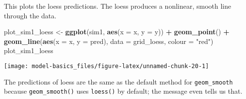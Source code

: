 \documentclass[]{book}
\newenvironment{Shaded}{\begin{snugshade}}{\end{snugshade}}
\newcommand{\DataTypeTok}[1]{\textcolor[rgb]{0.13,0.29,0.53}{#1}}
\newcommand{\KeywordTok}[1]{\textcolor[rgb]{0.13,0.29,0.53}{\textbf{#1}}}
\newcommand{\NormalTok}[1]{#1}
\newcommand{\OperatorTok}[1]{\textcolor[rgb]{0.81,0.36,0.00}{\textbf{#1}}}
\newcommand{\StringTok}[1]{\textcolor[rgb]{0.31,0.60,0.02}{#1}}
\theoremstyle{plain}
\theoremstyle{remark}
\theoremstyle{definition}
\theoremstyle{definition}
\theoremstyle{definition}
\theoremstyle{remark}
\begin{document}
\begin{Shaded}
\end{Shaded}

This plots the loess predictions. The loess produces a nonlinear, smooth
line through the data.

\begin{Shaded}
\begin{Highlighting}[]
\NormalTok{plot_sim1_loess <-}
\StringTok{  }\KeywordTok{ggplot}\NormalTok{(sim1, }\KeywordTok{aes}\NormalTok{(}\DataTypeTok{x =}\NormalTok{ x, }\DataTypeTok{y =}\NormalTok{ y)) }\OperatorTok{+}
\StringTok{  }\KeywordTok{geom_point}\NormalTok{() }\OperatorTok{+}
\StringTok{  }\KeywordTok{geom_line}\NormalTok{(}\KeywordTok{aes}\NormalTok{(}\DataTypeTok{x =}\NormalTok{ x, }\DataTypeTok{y =}\NormalTok{ pred), }\DataTypeTok{data =}\NormalTok{ grid_loess, }\DataTypeTok{colour =} \StringTok{"red"}\NormalTok{)}
\NormalTok{plot_sim1_loess}
\end{Highlighting}
\end{Shaded}

\begin{center}\texttt{[image: model-basics\_files/figure-latex/unnamed-chunk-20-1]} \end{center}

The predictions of loess are the same as the default method for
\texttt{geom\_smooth} because \texttt{geom\_smooth()} uses
\texttt{loess()} by default; the message even tells us that.
\end{document}
